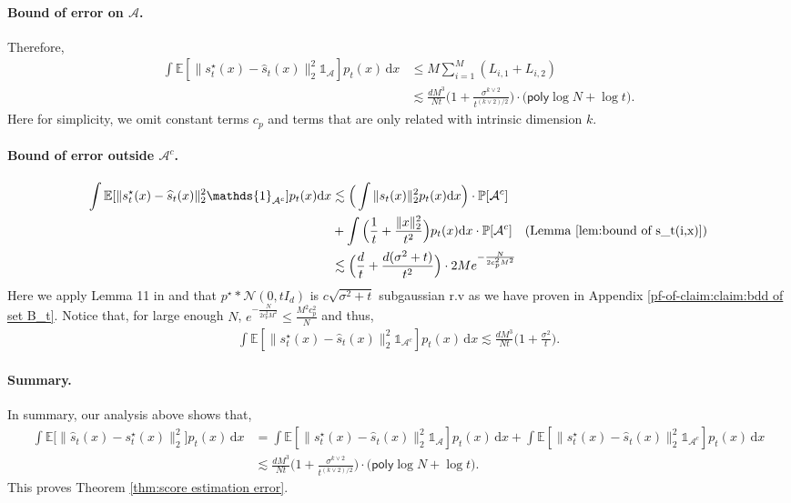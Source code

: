 \documentclass{article}
\newcommand{\ind}{\mathds{1}}
\newcommand{\diff}{\,\mathrm{d}}
\newcommand{\polylog}{\mathsf{poly}\log}
\theoremstyle{plain}
\theoremstyle{remark}
\begin{document}
\paragraph*{Bound of error on $\mathcal{A}$.}
Therefore, 
\begin{align*}
     \int \mathbb{E}[\| s_t^\star(x)-\widehat{s}_t(x)\|_2^2\ind_{\mathcal{A}}] p_t(x)\!\diff x &\leq M\sum_{i=1}^M (L_{i,1}+L_{i,2}) \\
     &\lesssim \frac{dM^3}{Nt} \Big( 1+\frac{\sigma^{k\vee2}}{t^{{(k\vee2)}/2}}\Big) \cdot \big(\polylog N +\log t\big).
\end{align*}
Here for simplicity, we omit constant terms $c_{p}$ and terms that are only related with intrinsic dimension $k$. 


\paragraph*{Bound of error outside $\mathcal{A}^c$.}
\begin{align*}
    \int \mathbb{E}[\| s_t^\star(x)-\widehat{s}_t(x)\|_2^2\ind_{\mathcal{A}^c}] p_t(x)\!\diff x &\lesssim  \Big(\int \|s_t(x)\|_2^2p_t(x) \!\diff x\Big) \cdot \mathbb{P}[\mathcal{A}^c] \\
    &+ \int \Big( \frac{1}{t} + \frac{\|x\|_2^2}{t^2} \Big) p_t(x)\! \diff x \cdot \mathbb{P}[\mathcal{A}^c] \quad (\text{Lemma \ref{lem:bound of s_t(i,x)}})\\
    &\lesssim \Big(\frac{d}{t} + \frac{d(\sigma^2+t)}{t^2} \Big) \cdot 2M e^{-\frac{N}{2c_{p}^2M^2}} 
\end{align*}
Here we apply Lemma 11 in \cite{cai2025minimaxoptimalityprobabilityflow} and that $p^\star \ast \mathcal{N}(0,tI_d)$ is $c\sqrt{\sigma^2+t}$ subgaussian r.v as we have proven in Appendix \ref{pf-of-claim:claim:bdd of set B_t}. 
Notice that, for large enough $N$, $e^{-\frac{N}{2c_{p}^2M^2}} \leq \frac{M^2c_{p}^2}{N}$ and thus, 
\begin{align*}
    \int \mathbb{E}[\| s_t^\star(x)-\widehat{s}_t(x)\|_2^2 \ind_{\mathcal{A}^c}] p_t(x)\!\diff x \lesssim \frac{dM^3}{Nt}\Big( 1+\frac{\sigma^2}{t}\Big).
\end{align*}

\paragraph*{Summary.}
In summary, our analysis above shows that, 
\begin{align*}
    \int \mathbb{E}\big[\|\widehat{s}_t(x)-s_t^\star(x)\|_2^2\big] p_t(x) \!\diff x &= \int \mathbb{E}[\| s_t^\star(x)-\widehat{s}_t(x)\|_2^2 \ind_{\mathcal{A}}] p_t(x) \!\diff x + \int \mathbb{E}[\| s_t^\star(x)-\widehat{s}_t(x)\|_2^2 \ind_{\mathcal{A}^c}] p_t(x) \!\diff x \\
    &\lesssim \frac{dM^3}{Nt}\Big( 1+\frac{\sigma^{k\vee2}}{t^{{(k\vee2)}/2}}\Big)  \cdot \big(\polylog N+\log t\big) .
\end{align*}
This proves Theorem \ref{thm:score estimation error}. 
\end{document}
